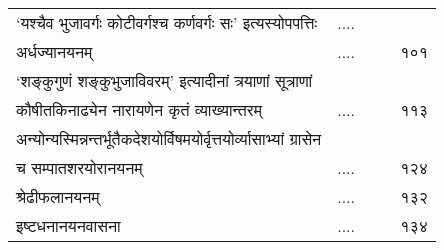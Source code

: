 \documentclass[11pt, openany]{book}
\begin{document}
\begin{tabular}{lp{2cm}p{.2cm}r}
`यश्चैव भुजावर्गः कोटीवर्गश्च कर्णवर्गः सः' इत्यस्योपपत्तिः  & ....&&~ \\
अर्धज्यानयनम् & ....&&~ १०१\\
`शङ्कुगुणं शङ्कुभुजाविवरम्' इत्यादीनां त्रयाणां सूत्राणां  \\
कौषीतकिनाढ्येन नारायणेन कृतं व्याख्यान्तरम् & ....&&~  ११३\\
अन्योन्यस्मिन्नन्तर्भूतैकदेशयोर्विषमयोर्वृत्तयोर्व्यासाभ्यां ग्रासेन \\
च सम्पातशरयोरानयनम् & ....&&~ १२४\\
श्रेढीफलानयनम् & .... && १३२\\
इष्टधनानयनवासना & .... && १३४\\
\end{tabular}	


\newpage
\end{document}

